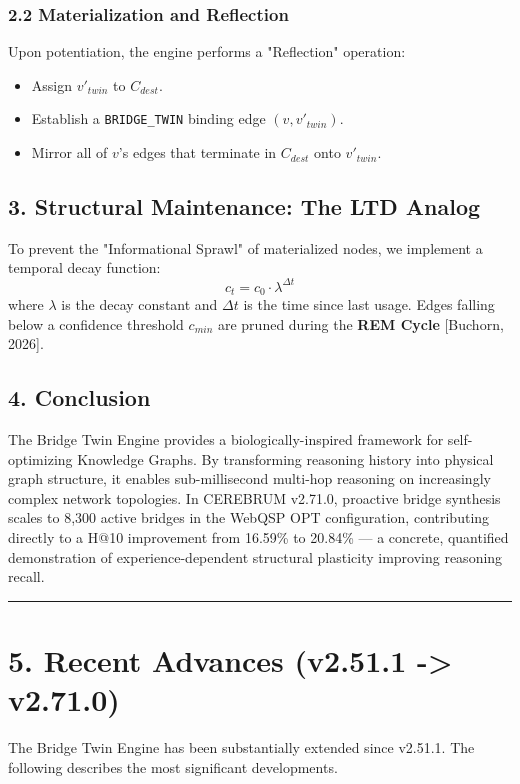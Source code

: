 \subsubsection*{2.2 Materialization and Reflection}
Upon potentiation, the engine performs a "Reflection" operation:
\begin{itemize}
  \item Assign $v'_{twin}$ to $C_{dest}$.
  \item Establish a \texttt{BRIDGE\_TWIN} binding edge $(v, v'_{twin})$.
  \item Mirror all of $v$'s edges that terminate in $C_{dest}$ onto $v'_{twin}$.
\end{itemize}


\subsection*{3. Structural Maintenance: The LTD Analog}
To prevent the "Informational Sprawl" of materialized nodes, we implement a temporal decay function:
$$c_t = c_0 \cdot \lambda^{\Delta t}$$
where $\lambda$ is the decay constant and $\Delta t$ is the time since last usage. Edges falling below a confidence threshold $c_{min}$ are pruned during the \textbf{REM Cycle} [Buchorn, 2026].

\subsection*{4. Conclusion}
The Bridge Twin Engine provides a biologically-inspired framework for self-optimizing Knowledge Graphs. By transforming reasoning history into physical graph structure, it enables sub-millisecond multi-hop reasoning on increasingly complex network topologies. In CEREBRUM v2.71.0, proactive bridge synthesis scales to 8,300 active bridges in the WebQSP OPT configuration, contributing directly to a H@10 improvement from 16.59\% to 20.84\% --- a concrete, quantified demonstration of experience-dependent structural plasticity improving reasoning recall.

\medskip\noindent\rule{\linewidth}{0.4pt}\medskip

\section*{5. Recent Advances (v2.51.1 -> v2.71.0)}

The Bridge Twin Engine has been substantially extended since v2.51.1. The following describes the most significant developments.


